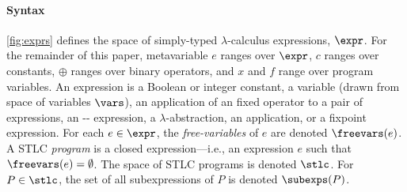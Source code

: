 \paragraph{Syntax} \autoref{fig:exprs} defines the space of
simply-typed $\lambda$-calculus expressions, $\expr$.
%
For the remainder of this paper, metavariable $e$ ranges over
$\expr$, %
$c$ ranges over constants, %
$\oplus$ ranges over binary operators, and $x$ and $f$ range over
program variables.
%
An expression is a Boolean or integer constant, %
a variable (drawn from space of variables $\vars$), %
an application of an fixed operator to a pair of expressions, %
an -- expression, %
a $\lambda$-abstraction, %
an application, or %
a fixpoint expression.
%
For each $e \in \expr$, the \emph{free-variables} of $e$ are denoted
$\freevars(e)$.
%
A STLC \emph{program} is a closed expression---i.e., an expression $e$
such that $\freevars(e) = \emptyset$.
%
The space of STLC programs is denoted $\stlc$.
%
For $P \in \stlc$, the set of all subexpressions of $P$ is denoted
$\subexps(P)$.

